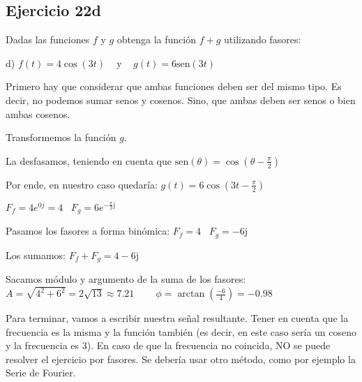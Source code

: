 \documentclass[11pt]{article}
\def\imj{\mathrm{j}}
\def\sen{\mathrm{sen}}
\begin{document}
	\subsection{Ejercicio 22d}
	Dadas las funciones $f$ y $g$ obtenga la función $f+g$ utilizando fasores:
	
	d) $f(t)=4\cos(3t) \;\;\;$ y $\;\;\;g(t)=6\sen(3t)$
	
	Primero hay que considerar que ambas funciones deben ser del mismo tipo. Es decir, no podemos sumar senos y cosenos. Sino, que ambas deben ser senos o bien ambas cosenos.
	
	Transformemos la función $g$.
	
	La desfasamos, teniendo en cuenta que $\sen(\theta)=\cos\left(\theta-\frac{\pi}{2}\right)$
	
	Por ende, en nuestro caso quedaría: $g(t)=6\cos\left(3t-\frac{\pi}{2}\right)$
	
	$F_{f}=4e^{0j}=4 \;\;\; F_{g}=6e^{-\frac{\pi}{2}\imj}$
	
	Pasamos los fasores a forma binómica:
	$F_{f}=4 \;\;\; F_{g}=-6\imj$
	
	Los sumamos:
	$F_{f}+F_{g}=4-6\imj$
	
	Sacamos módulo y argumento de la suma de los fasores:\\
	$\boxed{A=\sqrt{4^{2}+6^{2}}=2\sqrt{13}\approx7.21} \;\;\;\;\;\;\;\; \boxed{\phi=\arctan\left(\frac{-6}{4}\right)=-0.98}$
	
	Para terminar, vamos a escribir nuestra señal resultante. Tener en cuenta que la frecuencia es la misma y la función también (es decir, en este caso sería un coseno y la frecuencia es 3). En caso de que la frecuencia no coincida, NO se puede resolver el ejercicio por fasores. Se debería usar otro método, como por ejemplo la Serie de Fourier.
	
	
\end{document}

